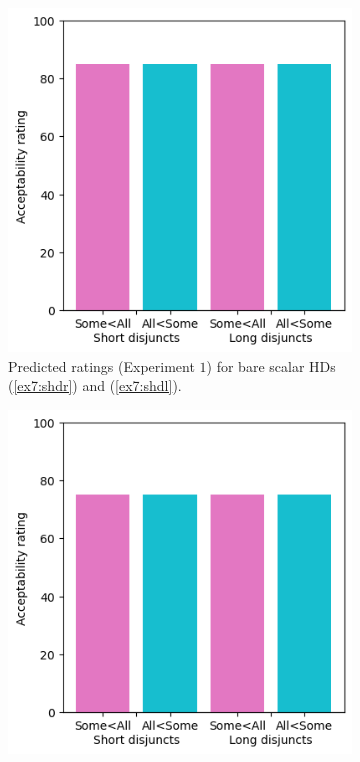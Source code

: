 \begin{figure}[H]
	\centering
	\begin{subfigure}[t]{.32\linewidth}
		\centering
		\includegraphics[width=\linewidth]{./images/pred-1a-noonly.png}
		\caption[]{Predicted ratings (Experiment $1$) for bare scalar HDs (\ref{ex7:shdr}) and (\ref{ex7:shdl}).}
	\end{subfigure}
	\hfill
	\begin{subfigure}[t]{.32\linewidth}
		\centering
		\includegraphics[width=\linewidth]{./images/pred-1a-only.png}

\end{subfigure}
\end{figure}

